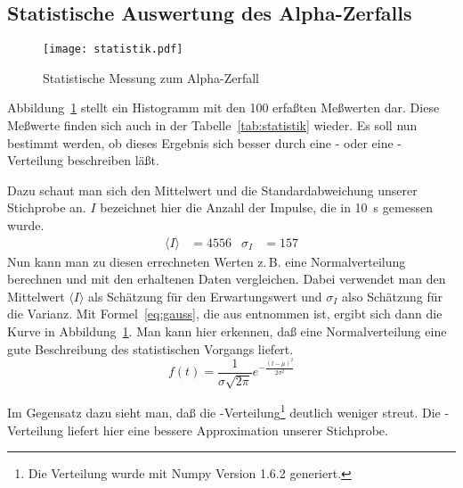 \subsection{Statistische Auswertung des Alpha-Zerfalls}

\begin{figure}
  \centering
  \texttt{[image: statistik.pdf]}
  \caption{Statistische Messung zum Alpha-Zerfall}
  \label{fig:statistik}
\end{figure}

Abbildung~\ref{fig:statistik} stellt ein Histogramm mit den 100 erfaßten
Meßwerten dar. Diese Meßwerte finden sich auch in der
Tabelle~\ref{tab:statistik} wieder. Es soll nun bestimmt werden, ob
dieses Ergebnis sich besser durch eine - oder eine
-Verteilung beschreiben läßt.

Dazu schaut man sich den Mittelwert und die Standardabweichung unserer
Stichprobe an. $I$ bezeichnet hier die Anzahl der Impulse, die in
\SI{10}{\second} gemessen wurde.
%
\begin{align}
  \label{eq:statistik}
  \langle I\rangle &= \num{4556} & \sigma_I &= \num{157}
\end{align}
%
Nun kann man zu diesen errechneten Werten z.\,B. eine Normalverteilung
berechnen und mit den erhaltenen Daten vergleichen. Dabei verwendet man
den Mittelwert $\langle I\rangle$ als Schätzung für den Erwartungswert
und $\sigma_I$ also Schätzung für die Varianz. Mit
Formel~\eqref{eq:gauss}, die aus \textcite[823]{bronstein} entnommen
ist, ergibt sich dann die Kurve in Abbildung~\ref{fig:statistik}. Man
kann hier erkennen, daß eine Normalverteilung eine gute Beschreibung des
statistischen Vorgangs liefert.
%
\begin{equation}
  \label{eq:gauss}
  f(t) = \frac{1}{\sigma\sqrt{2\pi}}e^{-\frac{(t-\mu)^2}{2\sigma^2}}
\end{equation}
%

Im Gegensatz dazu sieht man, daß die
-Verteilung\footnote{Die Verteilung wurde mit Numpy
  Version 1.6.2 generiert.} deutlich weniger streut. Die
-Verteilung liefert hier eine bessere Approximation unserer
Stichprobe.

